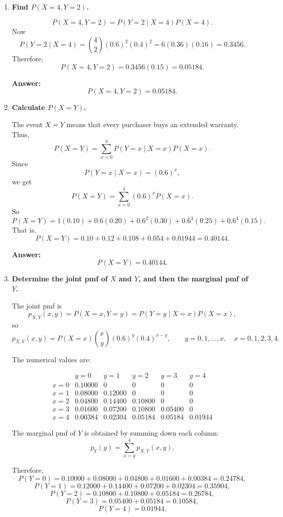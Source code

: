 \documentclass[11pt]{article}
\begin{document}
\begin{enumerate}
    \item[(a)] \textbf{Find $P(X=4,Y=2)$.}

    \[
    P(X=4,Y=2)=P(Y=2\mid X=4)P(X=4).
    \]
    Now
    \[
    P(Y=2\mid X=4)=\binom{4}{2}(0.6)^2(0.4)^2
    =6(0.36)(0.16)=0.3456.
    \]
    Therefore,
    \[
    P(X=4,Y=2)=0.3456(0.15)=0.05184.
    \]

    \textbf{Answer:}
    \[
    P(X=4,Y=2)=0.05184.
    \]

    \item[(b)] \textbf{Calculate $P(X=Y)$.}

    The event $X=Y$ means that every purchaser buys an extended warranty. Thus,
    \[
    P(X=Y)=\sum_{x=0}^4 P(Y=x\mid X=x)P(X=x).
    \]
    Since
    \[
    P(Y=x\mid X=x)=(0.6)^x,
    \]
    we get
    \[
    P(X=Y)=\sum_{x=0}^4 (0.6)^x P(X=x).
    \]
    So
    \[
    P(X=Y)=1(0.10)+0.6(0.20)+0.6^2(0.30)+0.6^3(0.25)+0.6^4(0.15).
    \]
    That is,
    \[
    P(X=Y)=0.10+0.12+0.108+0.054+0.01944=0.40144.
    \]

    \textbf{Answer:}
    \[
    P(X=Y)=0.40144.
    \]

    \item[(c)] \textbf{Determine the joint pmf of $X$ and $Y$, and then the marginal pmf of $Y$.}

    The joint pmf is
    \[
    p_{X,Y}(x,y)=P(X=x,Y=y)=P(Y=y\mid X=x)P(X=x),
    \]
    so
    \[
    p_{X,Y}(x,y)=P(X=x)\binom{x}{y}(0.6)^y(0.4)^{x-y},
    \qquad y=0,1,\dots,x,\quad x=0,1,2,3,4.
    \]

    The numerical values are:

    \[
    \begin{array}{c|ccccc}
    & y=0 & y=1 & y=2 & y=3 & y=4\\
    \hline
    x=0 & 0.10000 & 0 & 0 & 0 & 0\\
    x=1 & 0.08000 & 0.12000 & 0 & 0 & 0\\
    x=2 & 0.04800 & 0.14400 & 0.10800 & 0 & 0\\
    x=3 & 0.01600 & 0.07200 & 0.10800 & 0.05400 & 0\\
    x=4 & 0.00384 & 0.02304 & 0.05184 & 0.05184 & 0.01944
    \end{array}
    \]

    The marginal pmf of $Y$ is obtained by summing down each column:
    \[
    p_Y(y)=\sum_{x=y}^4 p_{X,Y}(x,y).
    \]

    Therefore,
    \[
    P(Y=0)=0.10000+0.08000+0.04800+0.01600+0.00384=0.24784,
    \]
    \[
    P(Y=1)=0.12000+0.14400+0.07200+0.02304=0.35904,
    \]
    \[
    P(Y=2)=0.10800+0.10800+0.05184=0.26784,
    \]
    \[
    P(Y=3)=0.05400+0.05184=0.10584,
    \]
    \[
    P(Y=4)=0.01944.
    \]


\end{enumerate}
\end{document}
